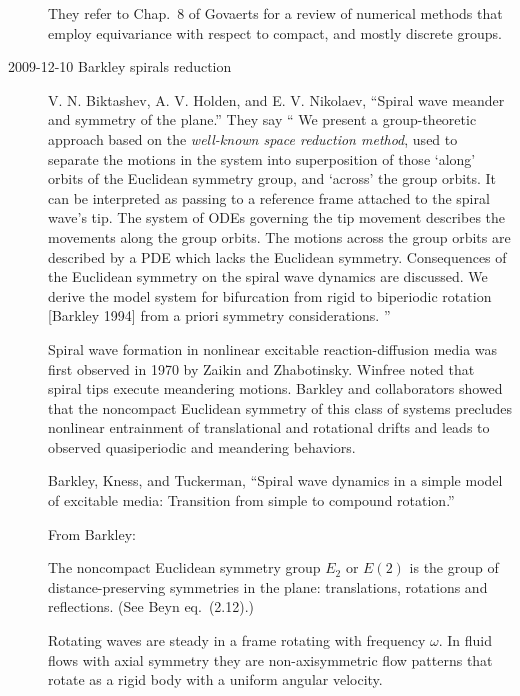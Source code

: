 \begin{description}
They refer to Chap.~8 of Govaerts for a review
of numerical methods that employ equivariance with respect to
compact, and mostly discrete groups.

\item[2009-12-10 Barkley spirals reduction]
V. N. Biktashev, A. V. Holden, and E. V. Nikolaev,
``Spiral wave meander and symmetry of the plane.''
They say
``
We present a group-theoretic approach based on the
{\em well-known space reduction method}, used to separate the motions in the
system into superposition of those `along' orbits of the
Euclidean symmetry group, and `across' the group orbits. It can
be interpreted as passing to a reference frame attached to the
spiral wave's tip. The system of ODEs governing the tip
movement describes the movements along the group orbits. The
motions across the group orbits are described by a PDE which
lacks the Euclidean symmetry. Consequences of the Euclidean
symmetry on the spiral wave dynamics are discussed. We derive
the model system for bifurcation from rigid to biperiodic
rotation [Barkley 1994] from a priori symmetry considerations.
''

Spiral wave formation in nonlinear excitable reaction-diffusion
media was first observed
in 1970 by Zaikin and Zhabotinsky.
Winfree noted that spiral tips
execute meandering motions.
Barkley and collaborators showed that
the noncompact Euclidean symmetry of this class of systems
precludes nonlinear entrainment of translational and rotational
drifts and leads to observed quasiperiodic and meandering
behaviors.

Barkley, Kness, and Tuckerman,
``Spiral wave dynamics in a simple model of excitable
		 media: {T}ransition from simple to compound rotation.''

From Barkley:

The noncompact Euclidean symmetry group $E_2$ or $E(2)$ is the group
of distance-preserving symmetries in the plane: translations, rotations
and reflections.
(See Beyn eq.~(2.12).)

Rotating waves are steady
in a frame rotating with frequency $\omega$. In fluid flows with
axial symmetry they are non-axisymmetric flow patterns that
rotate as a rigid body with a uniform angular velocity.


\end{description}
